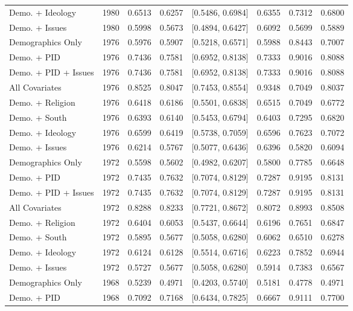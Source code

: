 \begin{longtable}{lrrrlrrr}
  Demo. + Ideology & 1980 & 0.6513 & 0.6257 & [0.5486, 0.6984] & 0.6355 & 0.7312 & 0.6800 \\ 
  Demo. + Issues & 1980 & 0.5998 & 0.5673 & [0.4894, 0.6427] & 0.6092 & 0.5699 & 0.5889 \\ 
  Demographics Only & 1976 & 0.5976 & 0.5907 & [0.5218, 0.6571] & 0.5988 & 0.8443 & 0.7007 \\ 
  Demo. + PID & 1976 & 0.7436 & 0.7581 & [0.6952, 0.8138] & 0.7333 & 0.9016 & 0.8088 \\ 
  Demo. + PID + Issues & 1976 & 0.7436 & 0.7581 & [0.6952, 0.8138] & 0.7333 & 0.9016 & 0.8088 \\ 
  All Covariates & 1976 & 0.8525 & 0.8047 & [0.7453, 0.8554] & 0.9348 & 0.7049 & 0.8037 \\ 
  Demo. + Religion & 1976 & 0.6418 & 0.6186 & [0.5501, 0.6838] & 0.6515 & 0.7049 & 0.6772 \\ 
  Demo. + South & 1976 & 0.6393 & 0.6140 & [0.5453, 0.6794] & 0.6403 & 0.7295 & 0.6820 \\ 
  Demo. + Ideology & 1976 & 0.6599 & 0.6419 & [0.5738, 0.7059] & 0.6596 & 0.7623 & 0.7072 \\ 
  Demo. + Issues & 1976 & 0.6214 & 0.5767 & [0.5077, 0.6436] & 0.6396 & 0.5820 & 0.6094 \\ 
  Demographics Only & 1972 & 0.5598 & 0.5602 & [0.4982, 0.6207] & 0.5800 & 0.7785 & 0.6648 \\ 
  Demo. + PID & 1972 & 0.7435 & 0.7632 & [0.7074, 0.8129] & 0.7287 & 0.9195 & 0.8131 \\ 
  Demo. + PID + Issues & 1972 & 0.7435 & 0.7632 & [0.7074, 0.8129] & 0.7287 & 0.9195 & 0.8131 \\ 
  All Covariates & 1972 & 0.8288 & 0.8233 & [0.7721, 0.8672] & 0.8072 & 0.8993 & 0.8508 \\ 
  Demo. + Religion & 1972 & 0.6404 & 0.6053 & [0.5437, 0.6644] & 0.6196 & 0.7651 & 0.6847 \\ 
  Demo. + South & 1972 & 0.5895 & 0.5677 & [0.5058, 0.6280] & 0.6062 & 0.6510 & 0.6278 \\ 
  Demo. + Ideology & 1972 & 0.6124 & 0.6128 & [0.5514, 0.6716] & 0.6223 & 0.7852 & 0.6944 \\ 
  Demo. + Issues & 1972 & 0.5727 & 0.5677 & [0.5058, 0.6280] & 0.5914 & 0.7383 & 0.6567 \\ 
  Demographics Only & 1968 & 0.5239 & 0.4971 & [0.4203, 0.5740] & 0.5181 & 0.4778 & 0.4971 \\ 
  Demo. + PID & 1968 & 0.7092 & 0.7168 & [0.6434, 0.7825] & 0.6667 & 0.9111 & 0.7700 \\ 

\end{longtable}
